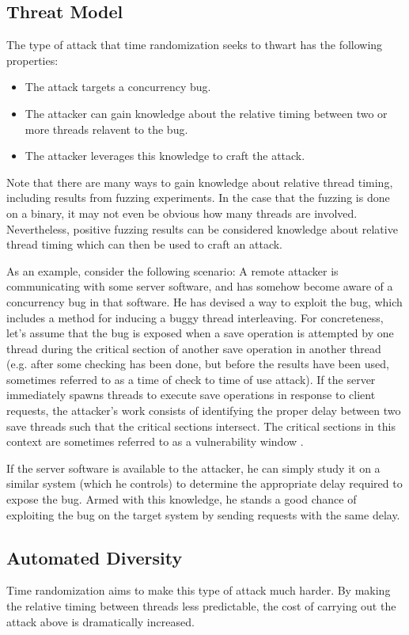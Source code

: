 \subsection{Threat Model}
The type of attack that time randomization seeks to thwart has the following properties:
\begin{itemize}
	\item The attack targets a concurrency bug.
	\item The attacker can gain knowledge about the relative timing between two or more threads relavent to the bug.
	\item The attacker leverages this knowledge to craft the attack.
\end{itemize}
Note that there are many ways to gain knowledge about relative thread timing, including results from fuzzing experiments.
In the case that the fuzzing is done on a binary, it may not even be obvious how many threads are involved.
Nevertheless, positive fuzzing results can be considered knowledge about relative thread timing which can then be used to craft an attack.

As an example, consider the following scenario:
A remote attacker is communicating with some server software, and has somehow become aware of a concurrency bug in that software.
He has devised a way to exploit the bug, which includes a method for inducing a buggy thread interleaving.
For concreteness, let's assume that the bug is exposed when a save operation is attempted by one thread during the critical section of another save operation in another thread (e.g. after some checking has been done, but before the results have been used, sometimes referred to as a time of check to time of use attack).
If the server immediately spawns threads to execute save operations in response to client requests, the attacker's work consists of identifying the proper delay between two save threads such that the critical sections intersect.
The critical sections in this context are sometimes referred to as a vulnerability window \cite{Yang2012}.

If the server software is available to the attacker, he can simply study it on a similar system (which he controls) to determine the appropriate delay required to expose the bug.
Armed with this knowledge, he stands a good chance of exploiting the bug on the target system by sending requests with the same delay.
\subsection{Automated Diversity}\label{automated-diversity}
Time randomization aims to make this type of attack much harder.
By making the relative timing between threads less predictable, the cost of carrying out the attack above is dramatically increased.

